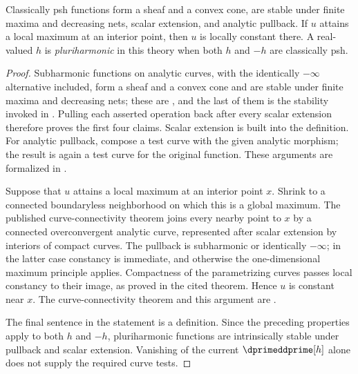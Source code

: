 \begin{proposition}
\label{prop:classical-psh-calculus}
Classically psh functions form a sheaf and a convex cone, are stable under
finite maxima and decreasing nets, scalar extension, and analytic pullback.
If $u$ attains a local maximum at an interior point, then $u$ is locally
constant there.  A real-valued $h$ is \emph{pluriharmonic} in this theory
when both $h$ and $-h$ are classically psh.
\end{proposition}
\begin{proof}
Subharmonic functions on analytic curves, with the identically
$-\infty$ alternative included, form a sheaf and a convex cone and
are stable under finite maxima and decreasing nets; these are
\cite[Corollaire~3.1.13 and Proposition~3.1.8]{Thu05}, and the last of them
is the stability invoked in .
Pulling each asserted
operation back after every scalar extension therefore proves the first four
claims.  Scalar extension is built into the definition.  For analytic
pullback, compose a test curve with the given analytic morphism; the result
is again a test curve for the original function.  These arguments are
formalized in \cite[Proposition~4.2]{GR25Classical}.

Suppose that $u$ attains a local maximum at an interior point $x$.  Shrink to
a connected boundaryless neighborhood on which this is a global maximum.
The published curve-connectivity theorem joins every nearby point to $x$
by a connected overconvergent analytic curve, represented after scalar
extension by interiors of compact curves.  The pullback is subharmonic or identically $-\infty$; in the latter case
constancy is immediate, and otherwise the one-dimensional maximum principle
applies.  Compactness of the parametrizing curves passes local constancy
to their image, as proved in the cited theorem.  Hence $u$ is constant near $x$.
The curve-connectivity theorem and this argument are
\cite[Theorems~5.4 and 6.1]{GR25Classical}.

The final sentence in the statement is a definition.  Since the preceding
properties apply to both $h$ and $-h$, pluriharmonic functions are
intrinsically stable under pullback and scalar extension.  Vanishing of the
current $\dprimeddprime[h]$ alone does not supply the required curve tests.
\end{proof}

